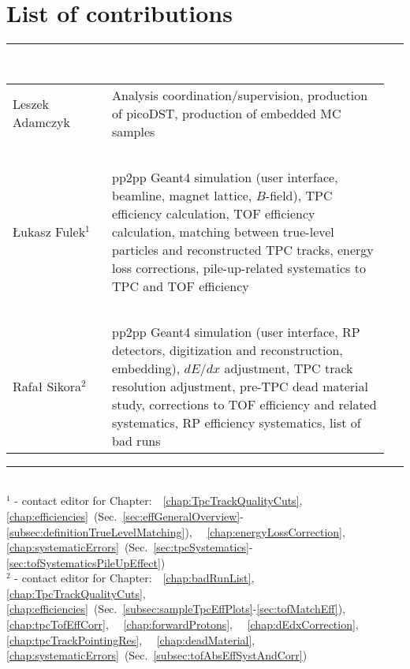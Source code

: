 \section*{\LARGE List of contributions}%
%
   \rule{\textwidth}{1.0pt}\\[5pt]%
      \begin{tabular}{>{\raggedright}p{0.25\linewidth}p{0.7\linewidth}}
		Leszek Adamczyk & Analysis coordination/supervision, production of picoDST, production of embedded MC samples\\
		~&~\\
		Łukasz Fulek$^{1}$  & pp2pp Geant4 simulation (user interface, beamline, magnet lattice, $B$-field), TPC efficiency calculation, TOF efficiency calculation, matching between true-level particles and reconstructed TPC tracks, energy loss corrections, pile-up-related systematics to TPC and TOF efficiency\\
		~&~\\
        Rafał Sikora$^{2}$  & pp2pp Geant4 simulation (user interface, RP detectors, digitization and reconstruction, embedding), $dE/dx$ adjustment, TPC track resolution adjustment, pre-TPC dead material study, corrections to TOF efficiency and related systematics, RP efficiency systematics, list of bad runs\\
      \end{tabular}\newline
   \rule{\textwidth}{1.0pt}\\[10pt]%
   $^{1}$ - contact editor for Chapter:~~\ref{chap:TpcTrackQualityCuts},~~%
                                        \ref{chap:efficiencies}~(Sec.~\ref{sec:effGeneralOverview}-\ref{subsec:definitionTrueLevelMatching}),~~%
                                        \ref{chap:energyLossCorrection},~~%
                                        \ref{chap:systematicErrors}~(Sec.~\ref{sec:tpcSystematics}-\ref{sec:tofSystematicsPileUpEffect})%
                                        \\[2pt]
   $^{2}$ - contact editor for Chapter:~~\ref{chap:badRunList},~~%
                                        \ref{chap:TpcTrackQualityCuts},~~%
                                        \ref{chap:efficiencies}~(Sec.~\ref{subsec:sampleTpcEffPlots}-\ref{sec:tofMatchEff}),~~%
                                        \ref{chap:tpcTofEffCorr},~~%
                                        \ref{chap:forwardProtons},~~%
                                        \ref{chap:dEdxCorrection},~~%
                                        \ref{chap:tpcTrackPointingRes},~~%
                                        \ref{chap:deadMaterial},~~%
                                        \ref{chap:systematicErrors}~(Sec.~\ref{subsec:tofAbsEffSystAndCorr})%
                                        \\
   \\[50pt]%
